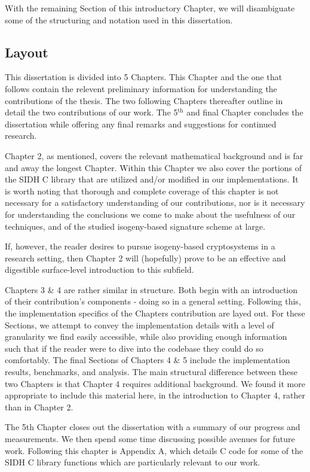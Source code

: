 With the remaining Section of this introductory Chapter, we will disambiguate some of the structuring and notation used in this dissertation.

\subsection{Layout}

This dissertation is divided into 5 Chapters. This Chapter and the one that follows contain the relevent preliminary information for understanding the contributions of the thesis. The two following Chapters thereafter outline in detail the two contributions of our work. The 5$^{\text{th}}$ and final Chapter concludes the dissertation while offering any final remarks and suggestions for continued research.

Chapter 2, as mentioned, covers the relevant mathematical background and is far and away the longest Chapter. Within this Chapter we also cover the portions of the SIDH C library that are utilized and/or modified in our implementations. It is worth noting that thorough and complete coverage of this chapter is not necessary for a satisfactory understanding of our contributions, nor is it necessary for understanding the conclusions we come to make about the usefulness of our techniques, and of the studied isogeny-based signature scheme at large.

If, however, the reader desires to pursue isogeny-based cryptosystems in a research setting, then Chapter 2 will (hopefully) prove to be an effective and digestible surface-level introduction to this subfield.  

Chapters 3 \& 4 are rather similar in structure. Both begin with an introduction of their contribution's components - doing so in a general setting. Following this, the implementation specifics of the Chapters contribution are layed out. For these Sections, we attempt to convey the implementation details with a level of granularity we find easily accessible, while also providing enough information such that if the reader were to dive into the codebase they could do so comfortably. The final Sections of Chapters 4 \& 5 include the implementation results, benchmarks, and analysis. The main structural difference between these two Chapters is that Chapter 4 requires additional background. We found it more appropriate to include this material here, in the introduction to Chapter 4, rather than in Chapter 2.

The 5th Chapter closes out the dissertation with a summary of our progress and measurements. We then spend some time discussing possible avenues for future work. Following this chapter is Appendix A, which details C code for some of the SIDH C library functions which are particularly relevant to our work.

